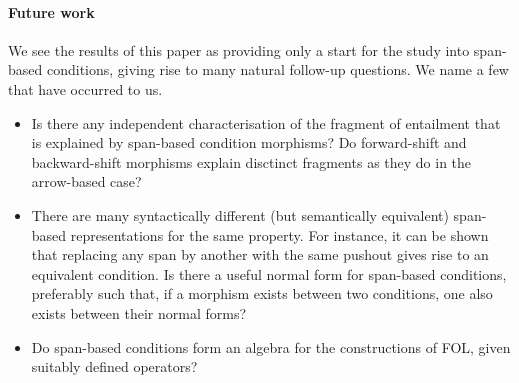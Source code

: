 \paragraph{Future work}

We see the results of this paper as providing only a start for the study into span-based conditions, giving rise to many natural follow-up questions. We name a few that have occurred to us.
%
\begin{itemize}
\item Is there any independent characterisation of the fragment of entailment that is explained by span-based condition morphisms? Do forward-shift and backward-shift morphisms explain disctinct fragments as they do in the arrow-based case?

\item There are many syntactically different (but semantically equivalent) span-based representations for the same property. For instance, it can be shown that replacing any span by another with the same pushout gives rise to an equivalent condition. Is there a useful normal form for span-based conditions, preferably such that, if a morphism exists between two conditions, one also exists between their normal forms?

\item Do span-based conditions form an algebra for the constructions of FOL, given suitably defined operators?
\end{itemize}
